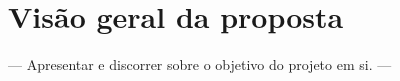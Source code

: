 

\section{Visão geral da proposta}

 — Apresentar e discorrer sobre o objetivo do projeto em si. — 




